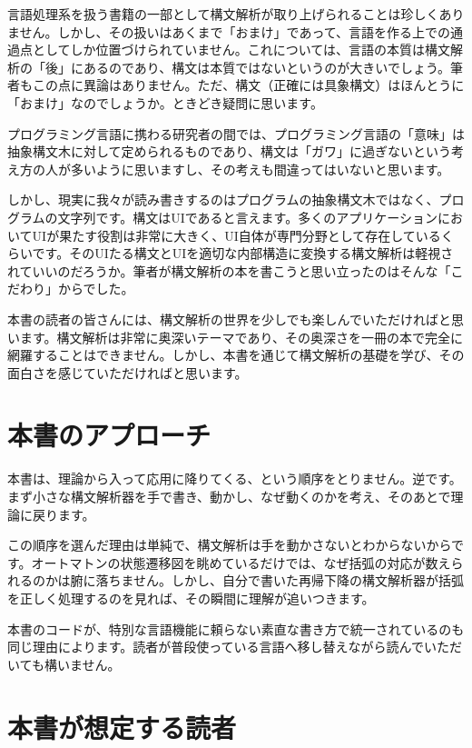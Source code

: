 言語処理系を扱う書籍の一部として構文解析が取り上げられることは珍しくありません。しかし、その扱いはあくまで「おまけ」であって、言語を作る上での通過点としてしか位置づけられていません。これについては、言語の本質は構文解析の「後」にあるのであり、構文は本質ではないというのが大きいでしょう。筆者もこの点に異論はありません。ただ、構文（正確には具象構文）はほんとうに「おまけ」なのでしょうか。ときどき疑問に思います。

プログラミング言語に携わる研究者の間では、プログラミング言語の「意味」は抽象構文木に対して定められるものであり、構文は「ガワ」に過ぎないという考え方の人が多いように思いますし、その考えも間違ってはいないと思います。

しかし、現実に我々が読み書きするのはプログラムの抽象構文木ではなく、プログラムの文字列です。構文はUIであると言えます。多くのアプリケーションにおいてUIが果たす役割は非常に大きく、UI自体が専門分野として存在しているくらいです。そのUIたる構文とUIを適切な内部構造に変換する構文解析は軽視されていいのだろうか。筆者が構文解析の本を書こうと思い立ったのはそんな「こだわり」からでした。

本書の読者の皆さんには、構文解析の世界を少しでも楽しんでいただければと思います。構文解析は非常に奥深いテーマであり、その奥深さを一冊の本で完全に網羅することはできません。しかし、本書を通じて構文解析の基礎を学び、その面白さを感じていただければと思います。

\section*{本書のアプローチ}

本書は、理論から入って応用に降りてくる、という順序をとりません。逆です。まず小さな構文解析器を手で書き、動かし、なぜ動くのかを考え、そのあとで理論に戻ります。

この順序を選んだ理由は単純で、構文解析は手を動かさないとわからないからです。オートマトンの状態遷移図を眺めているだけでは、なぜ括弧の対応が数えられるのかは腑に落ちません。しかし、自分で書いた再帰下降の構文解析器が括弧を正しく処理するのを見れば、その瞬間に理解が追いつきます。

本書のコードが、特別な言語機能に頼らない素直な書き方で統一されているのも同じ理由によります。読者が普段使っている言語へ移し替えながら読んでいただいても構いません。

\section*{本書が想定する読者}

